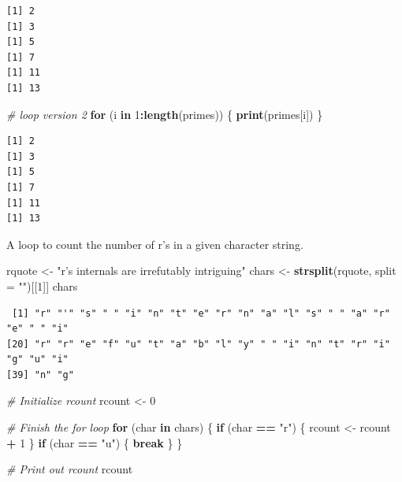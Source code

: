 \documentclass[
]{book}
\newenvironment{Shaded}{\begin{snugshade}}{\end{snugshade}}
\newcommand{\CommentTok}[1]{\textcolor[rgb]{0.56,0.35,0.01}{\textit{#1}}}
\newcommand{\ControlFlowTok}[1]{\textcolor[rgb]{0.13,0.29,0.53}{\textbf{#1}}}
\newcommand{\DataTypeTok}[1]{\textcolor[rgb]{0.13,0.29,0.53}{#1}}
\newcommand{\DecValTok}[1]{\textcolor[rgb]{0.00,0.00,0.81}{#1}}
\newcommand{\KeywordTok}[1]{\textcolor[rgb]{0.13,0.29,0.53}{\textbf{#1}}}
\newcommand{\NormalTok}[1]{#1}
\newcommand{\OperatorTok}[1]{\textcolor[rgb]{0.81,0.36,0.00}{\textbf{#1}}}
\newcommand{\StringTok}[1]{\textcolor[rgb]{0.31,0.60,0.02}{#1}}
\begin{document}
\begin{verbatim}
[1] 2
[1] 3
[1] 5
[1] 7
[1] 11
[1] 13
\end{verbatim}

\begin{Shaded}
\begin{Highlighting}[]
\CommentTok{# loop version 2}
\ControlFlowTok{for}\NormalTok{ (i }\ControlFlowTok{in} \DecValTok{1}\OperatorTok{:}\KeywordTok{length}\NormalTok{(primes)) \{}
  \KeywordTok{print}\NormalTok{(primes[i])}
\NormalTok{\}}
\end{Highlighting}
\end{Shaded}

\begin{verbatim}
[1] 2
[1] 3
[1] 5
[1] 7
[1] 11
[1] 13
\end{verbatim}

A loop to count the number of r's in a given character string.

\begin{Shaded}
\begin{Highlighting}[]
\NormalTok{rquote <-}\StringTok{ "r's internals are irrefutably intriguing"}
\NormalTok{chars <-}\StringTok{ }\KeywordTok{strsplit}\NormalTok{(rquote, }\DataTypeTok{split =} \StringTok{""}\NormalTok{)[[}\DecValTok{1}\NormalTok{]]}
\NormalTok{chars}
\end{Highlighting}
\end{Shaded}

\begin{verbatim}
 [1] "r" "'" "s" " " "i" "n" "t" "e" "r" "n" "a" "l" "s" " " "a" "r" "e" " " "i"
[20] "r" "r" "e" "f" "u" "t" "a" "b" "l" "y" " " "i" "n" "t" "r" "i" "g" "u" "i"
[39] "n" "g"
\end{verbatim}

\begin{Shaded}
\begin{Highlighting}[]
\CommentTok{# Initialize rcount}
\NormalTok{rcount <-}\StringTok{ }\DecValTok{0}

\CommentTok{# Finish the for loop}
\ControlFlowTok{for}\NormalTok{ (char }\ControlFlowTok{in}\NormalTok{ chars) \{}
  \ControlFlowTok{if}\NormalTok{ (char }\OperatorTok{==}\StringTok{ "r"}\NormalTok{) \{}
\NormalTok{    rcount <-}\StringTok{ }\NormalTok{rcount }\OperatorTok{+}\StringTok{ }\DecValTok{1}
\NormalTok{  \}}
  \ControlFlowTok{if}\NormalTok{ (char }\OperatorTok{==}\StringTok{ "u"}\NormalTok{) \{}
    \ControlFlowTok{break}
\NormalTok{  \}}
\NormalTok{\}}

\CommentTok{# Print out rcount}
\NormalTok{rcount}
\end{Highlighting}
\end{Shaded}
\end{document}
